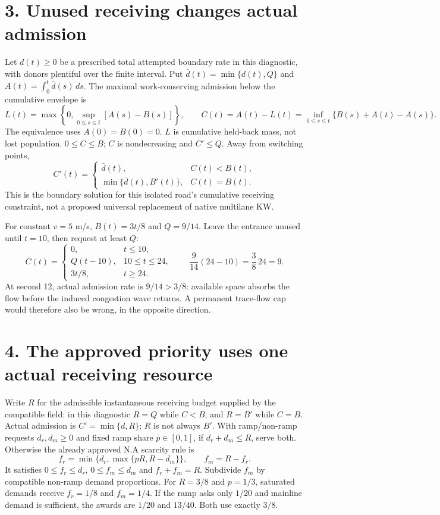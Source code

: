 \documentclass[11pt,a4paper]{article}
\begin{document}
\section*{3. Unused receiving changes actual admission}
Let $d(t)\ge0$ be a prescribed total attempted boundary rate in this
diagnostic, with donors plentiful over the finite interval. Put
$\bar d(t)=\min\{d(t),Q\}$ and $A(t)=\int_0^t\bar d(s)\,ds$.
The maximal work-conserving admission below the cumulative envelope is
\begin{equation}
 L(t)=\max\left\{0,\sup_{0\le s\le t}[A(s)-B(s)]\right\},\qquad
 C(t)=A(t)-L(t)
      =\inf_{0\le s\le t}\{B(s)+A(t)-A(s)\}.
\end{equation}
The equivalence uses $A(0)=B(0)=0$. $L$ is cumulative held-back mass,
not lost population. $0\le C\le B$; $C$ is nondecreasing and $C'\le Q$.
Away from switching points,
\begin{equation}
 C'(t)=
 \begin{cases}
 \bar d(t),&C(t)<B(t),\\
 \min\{\bar d(t),B'(t)\},&C(t)=B(t).
 \end{cases}
\end{equation}
This is the boundary solution for this isolated road's cumulative receiving
constraint, not a proposed universal replacement of native multilane KW.

For constant $v=5$ m/s, $B(t)=3t/8$ and $Q=9/14$. Leave the entrance
unused until $t=10$, then request at least $Q$:
\begin{equation}
 C(t)=
 \begin{cases}
 0,&t\le10,\\
 Q(t-10),&10\le t\le24,\\
 3t/8,&t\ge24.
 \end{cases}
 \qquad
 \frac9{14}(24-10)=\frac38\,24=9.
\end{equation}
At second 12, actual admission rate is $9/14>3/8$: available space absorbs
the flow before the induced congestion wave returns. A permanent trace-flow
cap would therefore also be wrong, in the opposite direction.

\newpage
\section*{4. The approved priority uses one actual receiving resource}
Write $R$ for the admissible instantaneous receiving budget supplied by the
compatible field: in this diagnostic $R=Q$ while $C<B$, and $R=B'$ while
$C=B$. Actual admission is $C'=\min\{d,R\}$; $R$ is not always $B'$.
With ramp/non-ramp requests
$d_r,d_m\ge0$ and fixed ramp share $p\in[0,1]$, if $d_r+d_m\le R$,
serve both. Otherwise the already approved N.A scarcity rule is
\begin{equation}
 f_r=\min\{d_r,\max\{pR,R-d_m\}\},\qquad f_m=R-f_r.
\end{equation}
It satisfies $0\le f_r\le d_r$, $0\le f_m\le d_m$ and
$f_r+f_m=R$. Subdivide $f_m$ by compatible non-ramp demand proportions.
For $R=3/8$ and $p=1/3$, saturated demands receive $f_r=1/8$ and $f_m=1/4$.
If the ramp asks only $1/20$ and mainline demand is sufficient, the awards
are $1/20$ and $13/40$. Both use exactly $3/8$.
\end{document}
